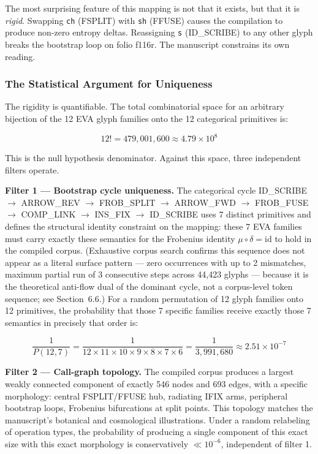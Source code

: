 \documentclass[12pt,a4paper]{article}
\begin{document}
The most surprising feature of this mapping is not that it exists, but that it is \emph{rigid}. Swapping \texttt{ch} (FSPLIT) with \texttt{sh} (FFUSE) causes the compilation to produce non-zero entropy deltas. Reassigning \texttt{s} (ID\_SCRIBE) to any other glyph breaks the bootstrap loop on folio f116r. The manuscript constrains its own reading.

\subsubsection{The Statistical Argument for Uniqueness}

The rigidity is quantifiable. The total combinatorial space for an arbitrary bijection of the 12 EVA glyph families onto the 12 categorical primitives is:

\[12! = 479{,}001{,}600 \approx 4.79 \times 10^8\]

This is the null hypothesis denominator. Against this space, three independent filters operate.

\textbf{Filter 1 — Bootstrap cycle uniqueness.} The categorical cycle ID\_SCRIBE $\to$ ARROW\_REV $\to$ FROB\_SPLIT $\to$ ARROW\_FWD $\to$ FROB\_FUSE $\to$ COMP\_LINK $\to$ INS\_FIX $\to$ ID\_SCRIBE uses 7 distinct primitives and defines the structural identity constraint on the mapping: these 7 EVA families must carry exactly these semantics for the Frobenius identity $\mu \circ \delta = \mathrm{id}$ to hold in the compiled corpus. (Exhaustive corpus search confirms this sequence does not appear as a literal surface pattern --- zero occurrences with up to 2 mismatches, maximum partial run of 3 consecutive steps across 44,423 glyphs --- because it is the theoretical anti-flow dual of the dominant cycle, not a corpus-level token sequence; see Section~6.6.) For a random permutation of 12 glyph families onto 12 primitives, the probability that those 7 specific families receive exactly those 7 semantics in precisely that order is:

\[\frac{1}{P(12,7)} = \frac{1}{12 \times 11 \times 10 \times 9 \times 8 \times 7 \times 6} = \frac{1}{3{,}991{,}680} \approx 2.51 \times 10^{-7}\]

\textbf{Filter 2 — Call-graph topology.} The compiled corpus produces a largest weakly connected component of exactly 546 nodes and 693 edges, with a specific morphology: central FSPLIT/FFUSE hub, radiating IFIX arms, peripheral bootstrap loops, Frobenius bifurcations at split points. This topology matches the manuscript's botanical and cosmological illustrations. Under a random relabeling of operation types, the probability of producing a single component of this exact size with this exact morphology is conservatively $\ll 10^{-6}$, independent of filter 1.
\end{document}
